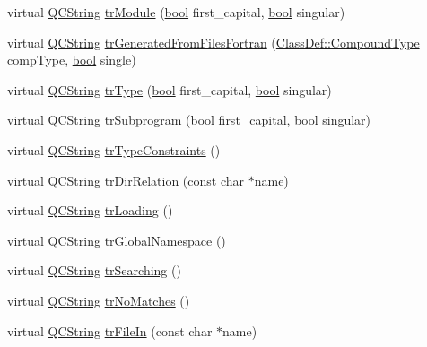 \begin{DoxyCompactItemize}
\item 
virtual \hyperlink{class_q_c_string}{Q\+C\+String} \hyperlink{class_translator_czech_ae26073360ea7857d1ccdbfd5888d4936}{tr\+Module} (\hyperlink{qglobal_8h_a1062901a7428fdd9c7f180f5e01ea056}{bool} first\+\_\+capital, \hyperlink{qglobal_8h_a1062901a7428fdd9c7f180f5e01ea056}{bool} singular)
\item 
virtual \hyperlink{class_q_c_string}{Q\+C\+String} \hyperlink{class_translator_czech_a630896cd6dc9b3676a679e621773be14}{tr\+Generated\+From\+Files\+Fortran} (\hyperlink{class_class_def_ae70cf86d35fe954a94c566fbcfc87939}{Class\+Def\+::\+Compound\+Type} comp\+Type, \hyperlink{qglobal_8h_a1062901a7428fdd9c7f180f5e01ea056}{bool} single)
\item 
virtual \hyperlink{class_q_c_string}{Q\+C\+String} \hyperlink{class_translator_czech_a1d323e601b7a72f042154d7f3fda9593}{tr\+Type} (\hyperlink{qglobal_8h_a1062901a7428fdd9c7f180f5e01ea056}{bool} first\+\_\+capital, \hyperlink{qglobal_8h_a1062901a7428fdd9c7f180f5e01ea056}{bool} singular)
\item 
virtual \hyperlink{class_q_c_string}{Q\+C\+String} \hyperlink{class_translator_czech_ad3fa0120c49499f1c4fb059508d3dc65}{tr\+Subprogram} (\hyperlink{qglobal_8h_a1062901a7428fdd9c7f180f5e01ea056}{bool} first\+\_\+capital, \hyperlink{qglobal_8h_a1062901a7428fdd9c7f180f5e01ea056}{bool} singular)
\item 
virtual \hyperlink{class_q_c_string}{Q\+C\+String} \hyperlink{class_translator_czech_afd3fc41092b7463f0f832e3662366288}{tr\+Type\+Constraints} ()
\item 
virtual \hyperlink{class_q_c_string}{Q\+C\+String} \hyperlink{class_translator_czech_aec923d474d603728e43f9d24b3cef66b}{tr\+Dir\+Relation} (const char $\ast$name)
\item 
virtual \hyperlink{class_q_c_string}{Q\+C\+String} \hyperlink{class_translator_czech_a07c7249f8f2d79c3c4b178f10eb09473}{tr\+Loading} ()
\item 
virtual \hyperlink{class_q_c_string}{Q\+C\+String} \hyperlink{class_translator_czech_a654d86b073aa580dfd0bdcc27cadff56}{tr\+Global\+Namespace} ()
\item 
virtual \hyperlink{class_q_c_string}{Q\+C\+String} \hyperlink{class_translator_czech_a6f7099bfc63f164b21bc85814bc95e94}{tr\+Searching} ()
\item 
virtual \hyperlink{class_q_c_string}{Q\+C\+String} \hyperlink{class_translator_czech_a06102d25b5bcefb28b5e0e67faa4b9a5}{tr\+No\+Matches} ()
\item 
virtual \hyperlink{class_q_c_string}{Q\+C\+String} \hyperlink{class_translator_czech_aea66b74447bd8dc6a9ef326d8e3edb05}{tr\+File\+In} (const char $\ast$name)

\end{DoxyCompactItemize}
